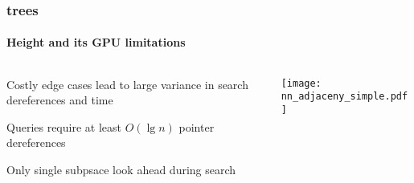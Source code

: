 \begin{frame}
  \frametitle{\kd trees}
  \framesubtitle{Height and its GPU limitations}

  \begin{columns}[T]
    \begin{column}{.5\textwidth}
      \begin{block}{}%
        {\color{white} \bullet\hspace{1mm} Costly edge cases lead to large variance in search dereferences 
          and time\\\vspace{0.5cm}
        
        \bullet\hspace{1mm} Queries require at least $O(\lg n)$ pointer dereferences\\\vspace{0.5cm}

      \bullet\hspace{1mm} Only single subpsace look ahead during search}
      \end{block}
    \end{column}
    \begin{column}{.5\textwidth}
      \begin{block}{}
        \texttt{[image: nn\_adjaceny\_simple.pdf]}
      \end{block}
    \end{column}
  \end{columns}
\end{frame}
